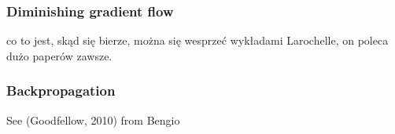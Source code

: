 \documentclass[a4paper,10pt]{report}
\begin{document}
	\subsubsection{Diminishing gradient flow} %
	  co to jest, skąd się bierze, można się wesprzeć wykładami Larochelle, on poleca dużo paperów zawsze.\\
	  
	\subsubsection{Backpropagation} %
	  See (Goodfellow, 2010) from Bengio\\
	
	

    
\end{document}

